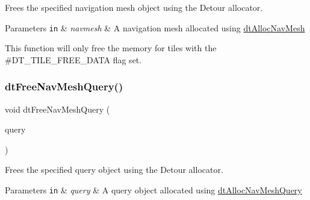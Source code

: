 Frees the specified navigation mesh object using the Detour allocator. 
\begin{DoxyParams}[1]{Parameters}
\mbox{\tt in}  & {\em navmesh} & A navigation mesh allocated using \hyperlink{group__detour_ga73648d53c5a414855a2aa264aab9263c}{dt\+Alloc\+Nav\+Mesh}\\
\hline
\end{DoxyParams}
\begin{DoxyParagraph}{}

\end{DoxyParagraph}
This function will only free the memory for tiles with the \#\+D\+T\+\_\+\+T\+I\+L\+E\+\_\+\+F\+R\+E\+E\+\_\+\+D\+A\+TA flag set. \mbox{\label{group__detour_ga24ccc133f15a0aa85f06f1c1ead2e6c4}} 
\subsubsection{\texorpdfstring{dt\+Free\+Nav\+Mesh\+Query()}{dtFreeNavMeshQuery()}}
{\footnotesize\ttfamily void dt\+Free\+Nav\+Mesh\+Query (\begin{DoxyParamCaption}\item[{\hyperlink{classdtNavMeshQuery}{dt\+Nav\+Mesh\+Query} $\ast$}]{query }\end{DoxyParamCaption})}

Frees the specified query object using the Detour allocator. 
\begin{DoxyParams}[1]{Parameters}
\mbox{\tt in}  & {\em query} & A query object allocated using \hyperlink{group__detour_gae547f165feefc955136130c8e22f207a}{dt\+Alloc\+Nav\+Mesh\+Query} \\
\hline
\end{DoxyParams}
